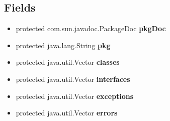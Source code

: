 \documentclass[11pt,a4paper]{report}
\begin{document}
{{{\subsection{Fields}{
\begin{itemize}
\item{
\label{org.stfm.texdoclet.Package.pkgDoc}\hypertarget{org.stfm.texdoclet.Package.pkgDoc}{protected com.sun.javadoc.PackageDoc {\bf  pkgDoc}}
}
\item{
\label{org.stfm.texdoclet.Package.pkg}\hypertarget{org.stfm.texdoclet.Package.pkg}{protected java.lang.String {\bf  pkg}}
}
\item{
\label{org.stfm.texdoclet.Package.classes}\hypertarget{org.stfm.texdoclet.Package.classes}{protected java.util.Vector {\bf  classes}}
}
\item{
\label{org.stfm.texdoclet.Package.interfaces}\hypertarget{org.stfm.texdoclet.Package.interfaces}{protected java.util.Vector {\bf  interfaces}}
}
\item{
\label{org.stfm.texdoclet.Package.exceptions}\hypertarget{org.stfm.texdoclet.Package.exceptions}{protected java.util.Vector {\bf  exceptions}}
}
\item{
\label{org.stfm.texdoclet.Package.errors}\hypertarget{org.stfm.texdoclet.Package.errors}{protected java.util.Vector {\bf  errors}}
}
\end{itemize}
}
}}}
\end{document}
